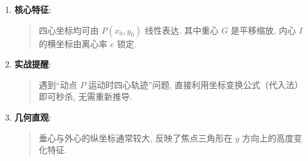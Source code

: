 \begin{summarybox}
    \begin{enumerate}[label=\protect\circled{\arabic*}, leftmargin=1.5em, itemsep=1ex]
        \item \textbf{核心特征}: 
        \begin{quote}
            \small 四心坐标均可由 $P(x_0, y_0)$ 线性表达. 其中重心 $G$ 是平移缩放, 内心 $I$ 的横坐标由离心率 $e$ 锁定.
        \end{quote}
        \item \textbf{实战提醒}: 
        \begin{quote}
            \small 遇到“动点 $P$ 运动时四心轨迹”问题, 直接利用坐标变换公式（代入法）即可秒杀, 无需重新推导.
        \end{quote}
        \item \textbf{几何直观}: 
        \begin{quote}
            \small 垂心与外心的纵坐标通常较大, 反映了焦点三角形在 $y$ 方向上的高度变化特征.
        \end{quote}
    \end{enumerate}
\end{summarybox}